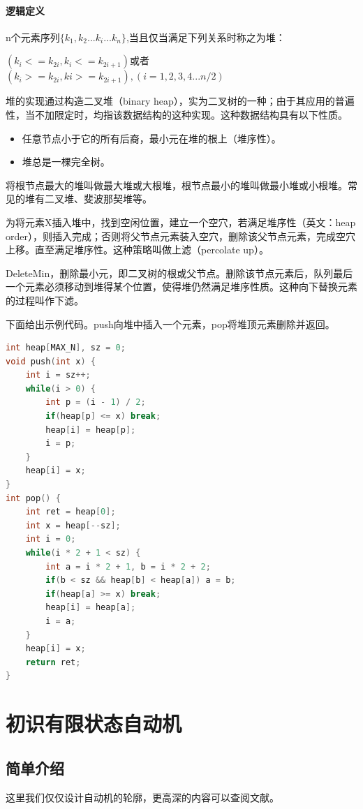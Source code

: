 \documentclass[a4paper]{article}
\begin{document}
\begin{CJK}{UTF8}{gbsn}
\paragraph{逻辑定义}
n个元素序列$\{k_1,k_2...k_i...k_n\}$,当且仅当满足下列关系时称之为堆：

$(k_i <= k_{2i},k_i <= k_{2i+1})$或者$(k_i >= k_{2i},ki >= k_{2i+1}), (i = 1,2,3,4...n/2)$

堆的实现通过构造二叉堆（binary heap），实为二叉树的一种；由于其应用的普遍性，当不加限定时，均指该数据结构的这种实现。这种数据结构具有以下性质。
\begin{itemize}
  \item 任意节点小于它的所有后裔，最小元在堆的根上（堆序性）。
  \item 堆总是一棵完全树。
\end{itemize}

将根节点最大的堆叫做最大堆或大根堆，根节点最小的堆叫做最小堆或小根堆。常见的堆有二叉堆、斐波那契堆等。

为将元素X插入堆中，找到空闲位置，建立一个空穴，若满足堆序性（英文：heap order），则插入完成；否则将父节点元素装入空穴，删除该父节点元素，完成空穴上移。直至满足堆序性。这种策略叫做上滤（percolate up）。\cite{shaffer}

DeleteMin，删除最小元，即二叉树的根或父节点。删除该节点元素后，队列最后一个元素必须移动到堆得某个位置，使得堆仍然满足堆序性质。这种向下替换元素的过程叫作下滤。

下面给出示例代码。push向堆中插入一个元素，pop将堆顶元素删除并返回。

\begin{lstlisting}[language=C++]
int heap[MAX_N], sz = 0;
void push(int x) {
    int i = sz++;
    while(i > 0) {
        int p = (i - 1) / 2;
        if(heap[p] <= x) break;
        heap[i] = heap[p];
        i = p;
    }
    heap[i] = x;
}
int pop() {
    int ret = heap[0];
    int x = heap[--sz];
    int i = 0;
    while(i * 2 + 1 < sz) {
        int a = i * 2 + 1, b = i * 2 + 2;
        if(b < sz && heap[b] < heap[a]) a = b;
        if(heap[a] >= x) break;
        heap[i] = heap[a];
        i = a;
    }
    heap[i] = x;
    return ret;
}
\end{lstlisting}


\section{初识有限状态自动机}
\subsection{简单介绍}
这里我们仅仅设计自动机的轮廓，更高深的内容可以查阅文献\cite{rich2008automata}。


\end{CJK}
\end{document}

